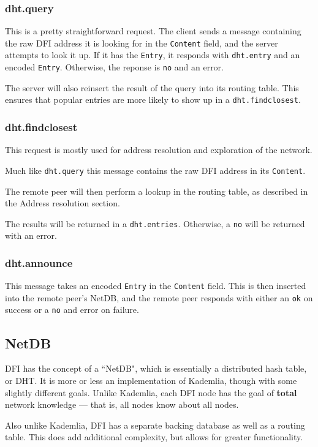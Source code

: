 	\subsubsection{dht.query}
	\begin{multicols}{2}
		This is a pretty straightforward request. The client sends a message
		containing the raw DFI address it is looking for in the \texttt{Content} field,
		and the server attempts to look it up. If it has the \texttt{Entry}, it responds
		with \texttt{dht.entry} and an encoded \texttt{Entry}. Otherwise, the reponse is
		\texttt{no} and an error.

		The server will also reinsert the result of the query into its routing
		table. This ensures that popular entries are more likely to show up in
		a \texttt{dht.findclosest}.
	\end{multicols}

	\subsubsection{dht.findclosest}
	\begin{multicols}{2}
		This request is mostly used for address resolution and exploration of
		the network. 

		Much like \texttt{dht.query} this message contains the raw DFI address
		in its \texttt{Content}.

		The remote peer will then perform a lookup in the routing table, as
		described in the Address resolution section. 

		The results will be returned in a \texttt{dht.entries}. Otherwise, a
		\texttt{no} will be returned with an error.
	\end{multicols}

	\subsubsection{dht.announce}
	\begin{multicols}{2}
		This message takes an encoded \texttt{Entry} in the \texttt{Content} field. This is then
		inserted into the remote peer's NetDB, and the remote peer responds with 
		either an \texttt{ok} on success or a \texttt{no} and error on failure.
	\end{multicols}

	\subsection{NetDB}
	\begin{multicols}{2}
		DFI has the concept of a ``NetDB", which is essentially a distributed hash
		table, or DHT. It is more or less an implementation of Kademlia, though
		with some slightly different goals. Unlike Kademlia, each DFI node has
		the goal of \textbf{total} network knowledge --- that is, all nodes know about
		all nodes. 
		
		Also unlike Kademlia, DFI has a separate backing database as
		well as a routing table. This does add additional complexity, but allows
		for greater functionality.
	\end{multicols}

